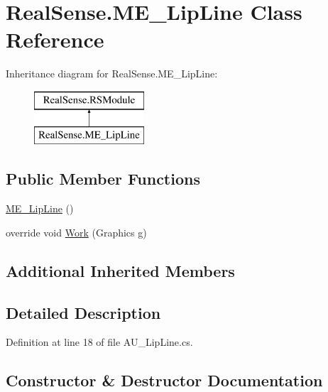 \hypertarget{class_real_sense_1_1_m_e___lip_line}{}\section{Real\+Sense.\+M\+E\+\_\+\+Lip\+Line Class Reference}
\label{class_real_sense_1_1_m_e___lip_line}
Inheritance diagram for Real\+Sense.\+M\+E\+\_\+\+Lip\+Line\+:\begin{figure}[H]
\begin{center}
\leavevmode
\includegraphics[height=2.000000cm]{class_real_sense_1_1_m_e___lip_line}
\end{center}
\end{figure}
\subsection*{Public Member Functions}
\begin{DoxyCompactItemize}
\item 
\hyperlink{class_real_sense_1_1_m_e___lip_line_aeeb789bbecb2dd779344d92548c08220}{M\+E\+\_\+\+Lip\+Line} ()
\item 
override void \hyperlink{class_real_sense_1_1_m_e___lip_line_a1de9ddec603c8a501e392377cc3b2ffa}{Work} (Graphics g)
\end{DoxyCompactItemize}
\subsection*{Additional Inherited Members}


\subsection{Detailed Description}


Definition at line 18 of file A\+U\+\_\+\+Lip\+Line.\+cs.



\subsection{Constructor \& Destructor Documentation}
\mbox{\label{class_real_sense_1_1_m_e___lip_line_aeeb789bbecb2dd779344d92548c08220}} 
